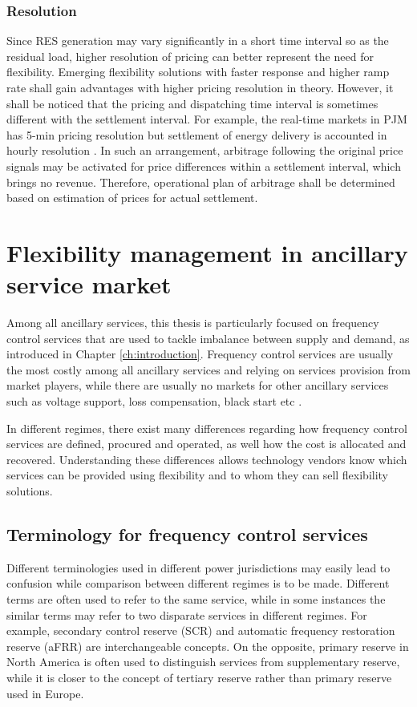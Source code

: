 \subsubsection{Resolution}
Since RES generation may vary significantly in a short time interval so as the residual load, higher resolution of pricing can better represent the need for flexibility. Emerging flexibility solutions with faster response and higher ramp rate shall gain advantages with higher pricing resolution in theory. However, it shall be noticed that the pricing and dispatching time interval is sometimes different with the settlement interval. For example, the real-time markets in PJM has 5-min pricing resolution but settlement of energy delivery is accounted in hourly resolution \cite{PJM2017}. In such an arrangement, arbitrage following the original price signals may be activated for price differences within a settlement interval, which brings no revenue. Therefore, operational plan of arbitrage shall be determined based on estimation of prices for actual settlement.


\section{Flexibility management in ancillary service market}
Among all ancillary services, this thesis is particularly focused on frequency control services that are used to tackle imbalance between supply and demand, as introduced in Chapter \ref{ch:introduction}. Frequency control services are usually the most costly among all ancillary services and relying on services provision from market players, while there are usually no markets for other ancillary services such as voltage support, loss compensation, black start etc \cite{Rebours2009,Cochran2013}. 

In different regimes, there exist many differences regarding how frequency control services are defined, procured and operated, as well how the cost is allocated and recovered. Understanding these differences allows technology vendors know which services can be provided using flexibility and to whom they can sell flexibility solutions.

\subsection{Terminology for frequency control services}

Different terminologies used in different power jurisdictions may easily lead to confusion while comparison between different regimes is to be made. Different terms are often used to refer to the same service, while in some instances the similar terms may refer to two disparate services in different regimes. For example, secondary control reserve (SCR) and automatic frequency restoration reserve (aFRR) are interchangeable concepts. On the opposite, primary reserve in North America is often used to distinguish services from supplementary reserve, while it is closer to the concept of tertiary reserve rather than primary reserve used in Europe.

